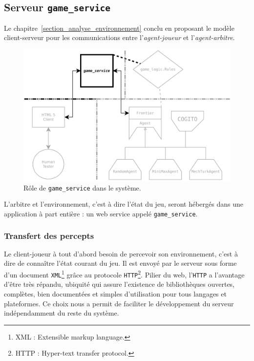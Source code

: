 \subsection{Serveur \texttt{game\_service}}
Le chapitre~\ref{section_analyse_environnement} conclu en proposant le modèle client-serveur pour les communications entre l'\emph{agent-joueur} et l'\emph{agent-arbitre}.

\begin{figure}[H] 
\centering
\includegraphics[width=\textwidth]{files/william/archi_serveur} 
\caption{Rôle de \texttt{game\_service} dans le système.} 
\end{figure}

L'arbitre et l'environnement, c'est à dire l'état du jeu, seront hébergés dans une application à part entière : un \og web service \fg{} appelé \texttt{game\_service}.
\subsubsection{Transfert des percepts}
Le client-joueur à tout d'abord besoin de percevoir son environnement, c'est à dire de connaître l'état courant du jeu. Il est envoyé par le serveur sous forme d'un  document \texttt{XML}\footnote{ XML : Extensible markup language. } grâce au protocole \texttt{HTTP}\footnote{ HTTP : Hyper-text transfer  protocol. }. Pilier du web, l'\texttt{HTTP} a l'avantage d'être très  répandu, ubiquité qui assure l'existence de bibliothèques ouvertes,  complètes, bien documentées et simples d'utilisation pour tous langages et plateformes. Ce choix nous a permit de faciliter le développement du serveur indépendamment du reste du système.
